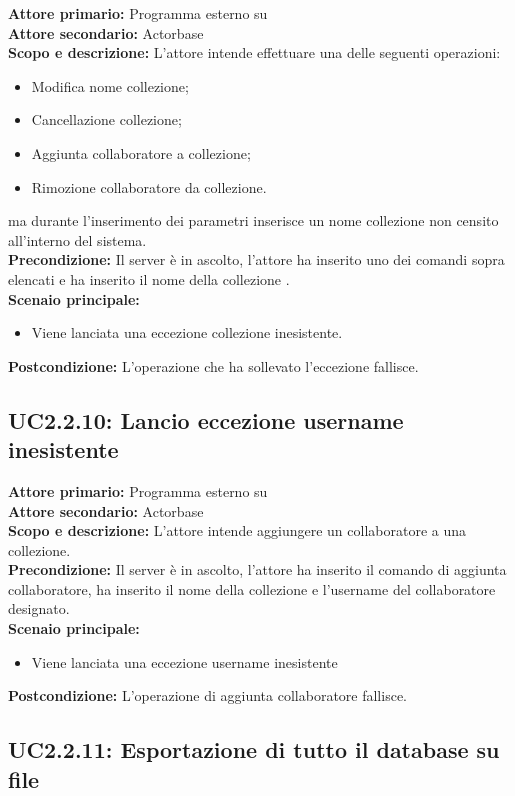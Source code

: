 \documentclass{scalatekids-article}
\begin{document}
\textbf{Attore primario:} Programma esterno su \\
\textbf{Attore secondario:} Actorbase\\
\textbf{Scopo e descrizione:} L'attore intende effettuare una delle seguenti operazioni:
\begin{itemize}
\item Modifica nome collezione;
\item Cancellazione collezione;
\item Aggiunta collaboratore a collezione;
\item Rimozione collaboratore da collezione.
\end{itemize}
ma durante l'inserimento dei parametri inserisce un nome collezione non censito all'interno del sistema.\\
\textbf{Precondizione:} Il server è in ascolto, l'attore ha inserito uno dei comandi sopra elencati e ha inserito il nome della collezione .\\
\textbf{Scenaio principale:}
\begin{itemize}
\item Viene lanciata una eccezione collezione inesistente.
\end{itemize}
\textbf{Postcondizione:} L'operazione che ha sollevato l'eccezione fallisce.

\subsection{UC2.2.10: Lancio eccezione username inesistente}

\textbf{Attore primario:} Programma esterno su \\
\textbf{Attore secondario:} Actorbase\\
\textbf{Scopo e descrizione:} L'attore intende aggiungere un collaboratore a una collezione.\\
\textbf{Precondizione:} Il server è in ascolto, l'attore ha inserito il comando di aggiunta collaboratore, ha inserito il nome della collezione e l'username del collaboratore designato.\\
\textbf{Scenaio principale:}
\begin{itemize}
\item Viene lanciata una eccezione username inesistente
\end{itemize}
\textbf{Postcondizione:} L'operazione di aggiunta collaboratore fallisce.

\subsection{UC2.2.11: Esportazione di tutto il database su file}
\end{document}
